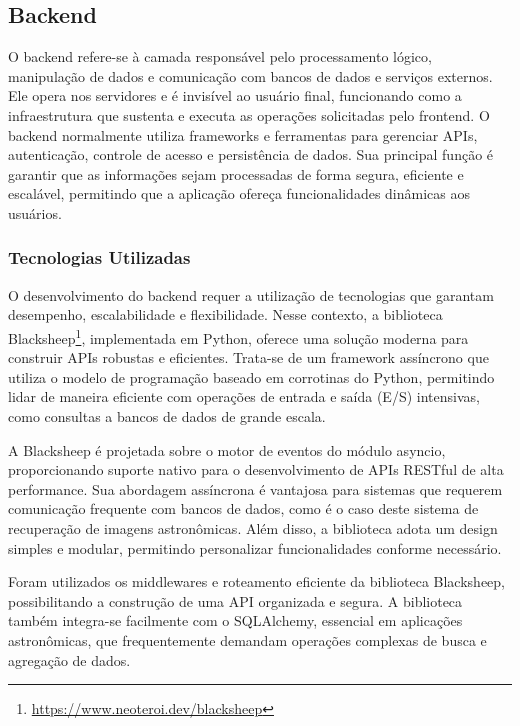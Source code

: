 \subsection{Backend}
\label{sec:si-backend}

O backend refere-se à camada responsável pelo processamento lógico, manipulação de dados e comunicação com bancos de dados e serviços externos. Ele opera nos servidores e é invisível ao usuário final, funcionando como a infraestrutura que sustenta e executa as operações solicitadas pelo frontend. O backend normalmente utiliza frameworks e ferramentas para gerenciar APIs, autenticação, controle de acesso e persistência de dados. Sua principal função é garantir que as informações sejam processadas de forma segura, eficiente e escalável, permitindo que a aplicação ofereça funcionalidades dinâmicas aos usuários.


\subsubsection{Tecnologias Utilizadas}
\label{sec:si-back-tech}

O desenvolvimento do backend requer a utilização de tecnologias que garantam desempenho, escalabilidade e flexibilidade. Nesse contexto, a biblioteca Blacksheep\footnote{\url{https://www.neoteroi.dev/blacksheep}}, implementada em Python, oferece uma solução moderna para construir APIs robustas e eficientes. Trata-se de um framework assíncrono que utiliza o modelo de programação baseado em corrotinas do Python, permitindo lidar de maneira eficiente com operações de entrada e saída (E/S) intensivas, como consultas a bancos de dados de grande escala.

A Blacksheep é projetada sobre o motor de eventos do módulo asyncio, proporcionando suporte nativo para o desenvolvimento de APIs RESTful de alta performance. Sua abordagem assíncrona é vantajosa para sistemas que requerem comunicação frequente com bancos de dados, como é o caso deste sistema de recuperação de imagens astronômicas. Além disso, a biblioteca adota um design simples e modular, permitindo personalizar funcionalidades conforme necessário.

Foram utilizados os middlewares e roteamento eficiente da biblioteca Blacksheep, possibilitando a construção de uma API organizada e segura. A biblioteca também integra-se facilmente com o SQLAlchemy, essencial em aplicações astronômicas, que frequentemente demandam operações complexas de busca e agregação de dados.

